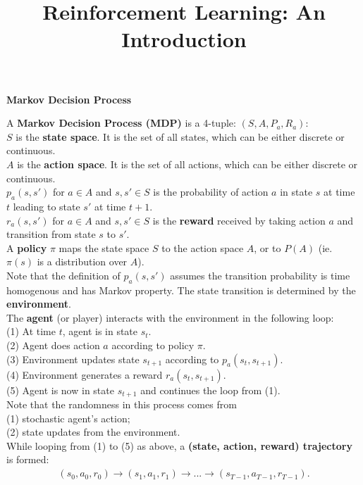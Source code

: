 \documentclass[12pt,oneside]{article}
\title{Reinforcement Learning: An Introduction}
\date{} %
\newcommand{\ra}[0]{\rightarrow}
\newcommand{\ali}[1]{\begin{align*}#1\end{align*}}
\theoremstyle{plain}
\theoremstyle{remark}
\begin{document}
\onehalfspace
\sloppy
\maketitle
{\bf Markov Decision Process\\}

A {\bf Markov Decision Process (MDP)} is a 4-tuple: $(S, A, P_a, R_a)$:\\
$S$ is the {\bf state space}. It is the set of all states, which can be either discrete or continuous.\\
$A$ is the {\bf action space}. It is the set of all actions, which can be either discrete or continuous.\\
$p_a(s, s')$ for $a \in A$ and $s, s' \in S$ is the probability of action $a$ in state $s$ at time $t$ leading to state $s'$ at time $t+1$.\\
$r_a(s, s')$ for $a \in A$ and $s, s' \in S$ is the {\bf reward} received by taking action $a$ and transition from state $s$ to $s'$.\\
A {\bf policy} $\pi$ maps the state space $S$ to the action space $A$, or to $P(A)$ (ie. $\pi(s)$ is a distribution over $A$).\\

Note that the definition of $p_a(s, s')$ assumes the transition probability is time homogenous and has Markov property. The state transition is determined by the {\bf environment}. \\

The {\bf agent} (or player) interacts with the environment in the following loop:\\
(1) At time $t$, agent is in state $s_t$.\\
(2) Agent does action $a$ according to policy $\pi$.\\
(3) Environment updates state $s_{t+1}$ according to $p_a(s_t, s_{t+1})$.\\
(4) Environment generates a reward $r_a(s_t, s_{t+1})$.\\
(5) Agent is now in state $s_{t+1}$ and continues the loop from (1).\\

Note that the randomness in this process comes from\\
(1) stochastic agent's action;\\
(2) state updates from the environment.\\

While looping from (1) to (5) as above, a {\bf (state, action, reward) trajectory} is formed:
\ali{ (s_0, a_0, r_0) \ra (s_1, a_1, r_1) \ra ... \ra (s_{T-1}, a_{T-1}, r_{T-1}).}  
\end{document}
